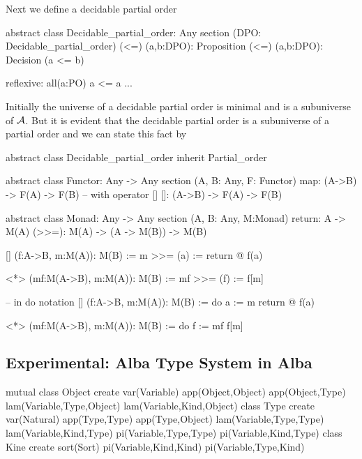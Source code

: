 Next we define a decidable partial order
%
\begin{alba}
  abstract class Decidable_partial_order: Any
    section (DPO: Decidable_partial_order)
      (<=) (a,b:DPO): Proposition
      (<=) (a,b:DPO): Decision (a <= b)

      reflexive: all(a:PO)
        a <= a
      ...
\end{alba}
%
Initially the universe of a decidable partial order is minimal and is a
subuniverse of $\cal{A}$. But it is evident that the decidable partial order is a
subuniverse of a partial order and we can state this fact by
%
\begin{alba}
  abstract class Decidable_partial_order inherit Partial_order
\end{alba}



\begin{alba}
  abstract class
    Functor: Any -> Any
  section (A, B: Any, F: Functor)
    map: (A->B) -> F(A) -> F(B)
    -- with operator []
    []:  (A->B) -> F(A) -> F(B)
\end{alba}


\begin{alba}
  abstract class Monad: Any -> Any
    section (A, B: Any, M:Monad)
      return: A -> M(A)
      (>>=): M(A) -> (A -> M(B)) -> M(B)

      [] (f:A->B, m:M(A)): M(B) :=
        m >>= (a) := return @ f(a)

      <*> (mf:M(A->B), m:M(A)): M(B) :=
        mf >>= (f) := f[m]

      -- in do notation
      [] (f:A->B, m:M(A)): M(B) :=
        do
          a := m
          return @ f(a)

      <*> (mf:M(A->B), m:M(A)): M(B) :=
        do
          f := mf
          f[m]
\end{alba}


\subsection{Experimental: Alba Type System in Alba}

\begin{alba}
  mutual
    class Object create
      var(Variable)
      app(Object,Object)
      app(Object,Type)
      lam(Variable,Type,Object)
      lam(Variable,Kind,Object)
    class Type create
      var(Natural)
      app(Type,Type)
      app(Type,Object)
      lam(Variable,Type,Type)
      lam(Variable,Kind,Type)
      pi(Variable,Type,Type)
      pi(Variable,Kind,Type)
    class Kine create
      sort(Sort)
      pi(Variable,Kind,Kind)
      pi(Variable,Type,Kind)
\end{alba}

